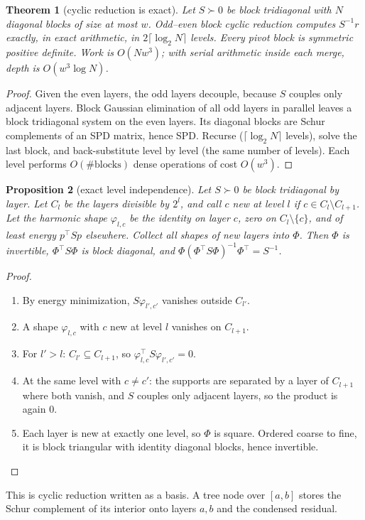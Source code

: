 \documentclass[11pt]{article}
\theoremstyle{plain}
\newtheorem{theorem}{Theorem}[section]
\newtheorem{proposition}[theorem]{Proposition}
\theoremstyle{definition}
\theoremstyle{remark}
\begin{document}
\begin{theorem}[cyclic reduction is exact]\label{thm:cr}
Let $S\succ0$ be block tridiagonal with $N$ diagonal blocks of size at most $w$. Odd--even block cyclic reduction computes $S^{-1}r$ exactly, in exact arithmetic, in $2\lceil\log_2N\rceil$ levels. Every pivot block is symmetric positive definite. Work is $O(Nw^3)$; with serial arithmetic inside each merge, depth is $O(w^3\log N)$.
\end{theorem}
\begin{proof}
Given the even layers, the odd layers decouple, because $S$ couples only adjacent layers. Block Gaussian elimination of all odd layers in parallel leaves a block tridiagonal system on the even layers. Its diagonal blocks are Schur complements of an SPD matrix, hence SPD. Recurse ($\lceil\log_2N\rceil$ levels), solve the last block, and back-substitute level by level (the same number of levels). Each level performs $O(\#\text{blocks})$ dense operations of cost $O(w^3)$.
\end{proof}

\begin{proposition}[exact level independence]\label{prop:levels}
Let $S\succ0$ be block tridiagonal by layer. Let $C_l$ be the layers divisible by $2^l$, and call $c$ \emph{new} at level $l$ if $c\in C_l\setminus C_{l+1}$. Let the harmonic shape $\varphi_{l,c}$ be the identity on layer $c$, zero on $C_l\setminus\{c\}$, and of least energy $p^\top Sp$ elsewhere. Collect all shapes of new layers into $\Phi$. Then $\Phi$ is invertible, $\Phi^\top S\Phi$ is block diagonal, and $\Phi(\Phi^\top S\Phi)^{-1}\Phi^\top=S^{-1}$.
\end{proposition}
\begin{proof}
\begin{enumerate}[label=(\roman*),leftmargin=1.6em]
  \item By energy minimization, $S\varphi_{l',c'}$ vanishes outside $C_{l'}$.
  \item A shape $\varphi_{l,c}$ with $c$ new at level $l$ vanishes on $C_{l+1}$.
  \item For $l'>l$: $C_{l'}\subseteq C_{l+1}$, so $\varphi_{l,c}^\top S\varphi_{l',c'}=0$.
  \item At the same level with $c\ne c'$: the supports are separated by a layer of $C_{l+1}$ where both vanish, and $S$ couples only adjacent layers, so the product is again $0$.
  \item Each layer is new at exactly one level, so $\Phi$ is square. Ordered coarse to fine, it is block triangular with identity diagonal blocks, hence invertible.
\end{enumerate}
\end{proof}
This is cyclic reduction written as a basis. A tree node over $[a,b]$ stores the Schur complement of its interior onto layers $a,b$ and the condensed residual.
\end{document}
